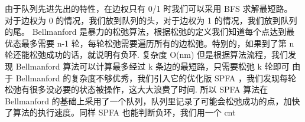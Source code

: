 {}\markdownRendererSectionBegin
{}\markdownRendererInterblockSeparator
{}由于队列先进先出的特性，在边权只有\markdownRendererDollarSign{} 0/1 \markdownRendererDollarSign{}时我们可以采用\markdownRendererDollarSign{} BFS\markdownRendererSoftLineBreak
{}\markdownRendererDollarSign{}求解最短路。\markdownRendererParagraphSeparator
{}对于边权为\markdownRendererDollarSign{} 0 \markdownRendererDollarSign{}的情况，我们放到队列的头，对于边权为\markdownRendererDollarSign{} 1 \markdownRendererDollarSign{}的情况，我们放到队列的尾。\markdownRendererInterblockSeparator
{}
\markdownRendererSectionEnd \markdownRendererSectionBegin
{}\markdownRendererInterblockSeparator
{}\markdownRendererDollarSign{} Bellmanford \markdownRendererDollarSign{}是暴力的松弛算法，根据松弛的定义我们知道每个点达到最优态最多需要\markdownRendererDollarSign{} n-1\markdownRendererSoftLineBreak
{}\markdownRendererDollarSign{}轮，每轮松弛需要遍历所有的边松弛。特别的，如果到了第\markdownRendererDollarSign{} n\markdownRendererSoftLineBreak
{}\markdownRendererDollarSign{}轮还能松弛成功的话，就说明有负环.\markdownRendererParagraphSeparator
{}复杂度\markdownRendererDollarSign{} O(nm) \markdownRendererDollarSign{}\markdownRendererParagraphSeparator
{}但是根据算法流程，我们发现\markdownRendererDollarSign{} Bellmanford\markdownRendererSoftLineBreak
{}\markdownRendererDollarSign{}算法可以计算最多经过\markdownRendererDollarSign{} k \markdownRendererDollarSign{}条边的最短路，只需要松弛\markdownRendererDollarSign{} k\markdownRendererSoftLineBreak
{}\markdownRendererDollarSign{}轮即可\markdownRendererInterblockSeparator
{}\markdownRendererInterblockSeparator
{}
\markdownRendererSectionEnd \markdownRendererSectionBegin
{}\markdownRendererInterblockSeparator
{}由于\markdownRendererDollarSign{} Bellmanford\markdownRendererSoftLineBreak
{}\markdownRendererDollarSign{}的复杂度不够优秀，我们引入它的优化版\markdownRendererDollarSign{} SPFA \markdownRendererDollarSign{}，我们发现每轮松弛有很多没必要的状态被操作，这大大浪费了时间.\markdownRendererParagraphSeparator
{}所以\markdownRendererDollarSign{} SPFA\markdownRendererSoftLineBreak
{}\markdownRendererDollarSign{}算法在\markdownRendererDollarSign{} Bellmanford \markdownRendererDollarSign{}的基础上采用了一个队列，队列里记录了可能会松弛成功的点，加快了算法的执行速度。同样\markdownRendererDollarSign{} SPFA \markdownRendererDollarSign{}也能判断负环，我们用一个\markdownRendererDollarSign{} cnt\markdownRendererSoftLineBreak
